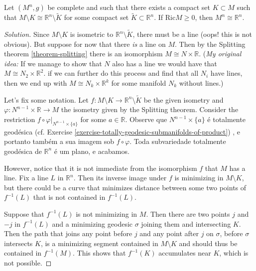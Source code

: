 \begin{exercise}
\label{exercise-complete-without-a-compact-set-isometric-to-Rn}
Let $(M^n,g)$ be complete and such that there exists a compact set
 $K\subset M$ such that $M\setminus K \cong \mathbb{R}^n \setminus \tilde{K}$
for some compact set $\tilde{K} \subset \mathbb{R}^n$. If $\text{Ric}M \geq 0$,
then $M^n \cong \mathbb{R}^n$.
\end{exercise}

\begin{proof}[Solution]
Since $M\setminus K$ is isometric to $\mathbb{R}^n\setminus \tilde{K}$, there
must be a line (oops! this is not obvious). But suppose for now that there {\it
is} a line on $M$. Then by the Splitting theorem \ref{theorem-splitting} there 
is an isomorphism $M \cong N \times \mathbb{R}$. ({\it My original idea:}
 If we manage to show that $N$ also has a line we would have that
 $M \cong N_2 \times \mathbb{R}^2$.  if we can further do this process and find
 that all $N_i$ have lines,
then we end up with $M \cong N_k \times \mathbb{R}^k$ for some manifold $N_k$
without lines.)

Let's fix some notation. Let 
$f:M\setminus K \to \mathbb{R}^n \setminus\tilde{K}$ be the given isometry and
$\varphi:N^{n-1}\times\mathbb{R} \to M$ the isometry given by the Splitting
theorem. Consider the restriction $f \circ \varphi |_{ N^{n-1}\times \{ a\}}$
for some $a \in \mathbb{R}$. Observe que $N^{n-1}\times \{ a\}$ é totalmente
geodésica (cf. Exercise \ref{exercise-totally-geodesic-submanifolds-of-product})
, e portanto também a sua imagem sob  $f \circ \varphi$. Toda subvariedade
totalmente geodésica de $\mathbb{R}^n$ é um plano, e acabamos.

However, notice that it is not immediate from the
isomorphism $f$ that $M$ has a line. Fix a line $L$ in $\mathbb{R}^n$. Then its
inverse image under $f$ is minimizing in $M \setminus K$, but there could be a
curve that minimizes distance between some two points of $f^{-1}(L)$ that is not
contained in $f^{-1}(L)$.

Suppose that $f^{-1}(L)$ is not minimizing in $M$. Then there are two points $j$
and $-j$ in $f^{-1}(L)$ and a minimizing geodesic $\sigma$ joining them and
intersecting $K$. Then the path that joins any point before $j$ and any point
after $j$ on $\sigma$, before $\sigma$ intersects $K$, is a minimizing segment
contained in $M\setminus K$ and should thus be contained in $f^{-1}(M)$. This
shows that $f^{-1}(K)$ accumulates near $K$, which is not possible.
\end{proof}

